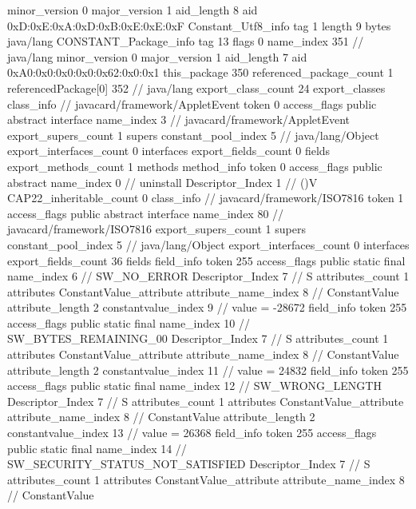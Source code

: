 {{{			minor_version	0
			major_version	1
			aid_length	8
			aid	0xD:0xE:0xA:0xD:0xB:0xE:0xE:0xF
		}
		Constant_Utf8_info {
			tag	1
			length	9
			bytes	java/lang
		}
		CONSTANT_Package_info {
			tag	13
			flags	0
			name_index	351		// java/lang
			minor_version	0
			major_version	1
			aid_length	7
			aid	0xA0:0x0:0x0:0x0:0x62:0x0:0x1
		}
	}
	this_package	350
	referenced_package_count	1
	referencedPackage[0]	352		// java/lang
	export_class_count	24
	export_classes {
		class_info {		// javacard/framework/AppletEvent
			token	0
			access_flags	public abstract interface
			name_index	3		// javacard/framework/AppletEvent
			export_supers_count	1
			supers {
				constant_pool_index	5		// java/lang/Object
			}
			export_interfaces_count	0
			interfaces {
			}
			export_fields_count	0
			fields {
			}
			export_methods_count	1
			methods {
				method_info {
					token	0
					access_flags	public abstract
					name_index	0		// uninstall
					Descriptor_Index	1		// ()V
				}
			}
			CAP22_inheritable_count	0
		}
		class_info {		// javacard/framework/ISO7816
			token	1
			access_flags	public abstract interface
			name_index	80		// javacard/framework/ISO7816
			export_supers_count	1
			supers {
				constant_pool_index	5		// java/lang/Object
			}
			export_interfaces_count	0
			interfaces {
			}
			export_fields_count	36
			fields {
			field_info {
				token	255
				access_flags	public static final
				name_index	6		// SW_NO_ERROR
				Descriptor_Index	7		// S
				attributes_count	1
				attributes {
				ConstantValue_attribute {
					attribute_name_index	8		// ConstantValue
					attribute_length	2
					constantvalue_index	9		// value = -28672
				}
				}
			}
			field_info {
				token	255
				access_flags	public static final
				name_index	10		// SW_BYTES_REMAINING_00
				Descriptor_Index	7		// S
				attributes_count	1
				attributes {
				ConstantValue_attribute {
					attribute_name_index	8		// ConstantValue
					attribute_length	2
					constantvalue_index	11		// value = 24832
				}
				}
			}
			field_info {
				token	255
				access_flags	public static final
				name_index	12		// SW_WRONG_LENGTH
				Descriptor_Index	7		// S
				attributes_count	1
				attributes {
				ConstantValue_attribute {
					attribute_name_index	8		// ConstantValue
					attribute_length	2
					constantvalue_index	13		// value = 26368
				}
				}
			}
			field_info {
				token	255
				access_flags	public static final
				name_index	14		// SW_SECURITY_STATUS_NOT_SATISFIED
				Descriptor_Index	7		// S
				attributes_count	1
				attributes {
				ConstantValue_attribute {
					attribute_name_index	8		// ConstantValue
}}}}}}}
